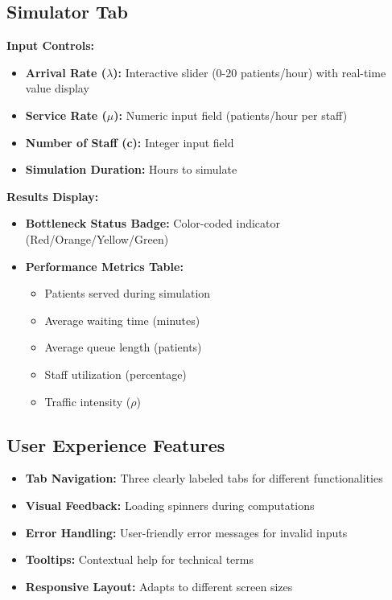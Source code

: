 \documentclass[12pt,a4paper]{article}
\begin{document}
\subsection{Simulator Tab}

\textbf{Input Controls:}
\begin{itemize}
    \item \textbf{Arrival Rate ($\lambda$):} Interactive slider (0-20 patients/hour) with real-time value display
    \item \textbf{Service Rate ($\mu$):} Numeric input field (patients/hour per staff)
    \item \textbf{Number of Staff (c):} Integer input field
    \item \textbf{Simulation Duration:} Hours to simulate
\end{itemize}

\textbf{Results Display:}
\begin{itemize}
    \item \textbf{Bottleneck Status Badge:} Color-coded indicator (Red/Orange/Yellow/Green)
    \item \textbf{Performance Metrics Table:}
    \begin{itemize}
        \item Patients served during simulation
        \item Average waiting time (minutes)
        \item Average queue length (patients)
        \item Staff utilization (percentage)
        \item Traffic intensity ($\rho$)
    \end{itemize}
\end{itemize}

\subsection{User Experience Features}

\begin{itemize}
    \item \textbf{Tab Navigation:} Three clearly labeled tabs for different functionalities
    \item \textbf{Visual Feedback:} Loading spinners during computations
    \item \textbf{Error Handling:} User-friendly error messages for invalid inputs
    \item \textbf{Tooltips:} Contextual help for technical terms
    \item \textbf{Responsive Layout:} Adapts to different screen sizes
\end{itemize}
\end{document}
